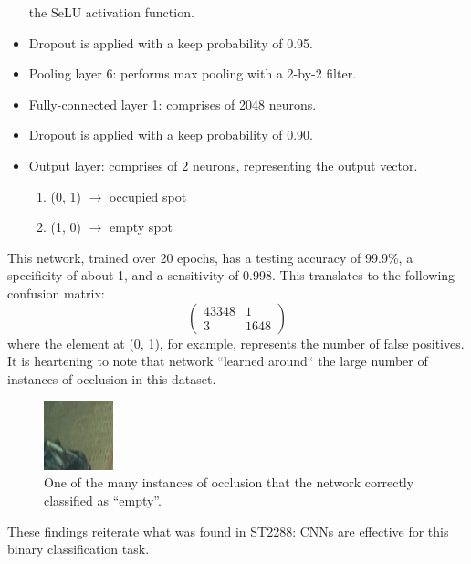 \documentclass[a4paper, 11pt]{article} %
\begin{document}
\begin{itemize}
		the SeLU activation function.
		\item[] Dropout is applied with a keep probability of 0.95.
		\item[] Pooling layer 6: performs max pooling with a 2-by-2 filter.
		\item[] Fully-connected layer 1: comprises of 2048 neurons.
		\item[] Dropout is applied with a keep probability of 0.90.
		\item[] Output layer: comprises of 2 neurons, representing the output 
		vector.
		\vspace*{-4mm}
		\begin{enumerate}
			\setlength\itemsep{-3mm}
			\item[] (0, 1) $\rightarrow$ occupied spot
			\item[] (1, 0) $\rightarrow$ empty spot
		\end{enumerate}
	\end{itemize}
	This network, trained over 20 epochs, has a testing accuracy of 99.9\%, a specificity of about 1, and a
	sensitivity of 0.998. This translates to the following confusion matrix:
	\begin{equation}
	\nonumber
	\begin{pmatrix} 43348 & 1\\ 3 & 1648 \end{pmatrix}
	\end{equation}
	where the element at (0, 1), for example, represents the number of false 
	positives. It is heartening to note that network ``learned around`` the 
	large number of instances of occlusion in this dataset.
	\begin{figure}
		\centering
		\includegraphics[width=2cm]{figures/nuslot_occlusion}
		\caption{One of the many instances of occlusion that the network 
		correctly classified as ``empty''.}
	\end{figure}
	These findings reiterate what was found in ST2288: CNNs are effective for 
	this binary classification task. 
\end{document}
